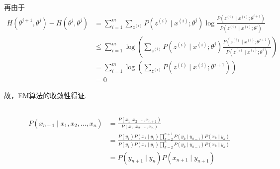 \documentclass[UTF8,a4paper,AutoFakeBold,AutoFakeSlant]{article}
\begin{document}
再由于
\begin{equation*}
  \begin{aligned}
    H\left(\theta^{j+1}, \theta^{j}\right)-H\left(\theta^{j}, \theta^{j}\right) & =\sum_{i=1}^{m} \sum_{z^{(i)}} P\left(z^{(i)} \mid x^{(i)} ; \theta^{j}\right) \log \frac{P\left(z^{(i)} \mid x^{(i)} ; \theta^{j+1}\right)}{P\left(z^{(i)} \mid x^{(i)} ; \theta^{j}\right)}                  \\
                                                                                & \leq \sum_{i=1}^{m} \log \left(\sum_{z^{(i)}} P\left(z^{(i)} \mid x^{(i)} ; \theta^{j}\right) \frac{P\left(z^{(i)} \mid x^{(i)} ; \theta^{j+1}\right)}{P\left(z^{(i)} \mid x^{(i)} ; \theta^{j}\right)}\right) \\
                                                                                & =\sum_{i=1}^{m} \log \left(\sum_{z^{(i)}} P\left(z^{(i)} \mid x^{(i)} ; \theta^{j+1}\right)\right)                                                                                                             \\
                                                                                & =0
  \end{aligned}
\end{equation*}

故，EM算法的收敛性得证.



\subsection{}

\begin{equation*}
  \begin{aligned}
    P\left(x_{n+1} \mid x_{1}, x_{2}, \ldots, x_{n}\right) & =\frac{P\left(x_{1}, x_{2}, \ldots, x_{n+1}\right)}{P\left(x_{1}, x_{2}, \ldots, x_{n}\right)}                                                                                                                                                                                   \\
                                                           & =\frac{P\left(y_{1}\right) P\left(x_{1} \mid y_{1}\right) \prod_{k=2}^{n+1} P\left(y_{k} \mid y_{k-1}\right) P\left(x_{k} \mid y_{k}\right)}{P\left(y_{1}\right) P\left(x_{1} \mid y_{1}\right) \prod_{k=2}^{n} P\left(y_{k} \mid y_{k-1}\right) P\left(x_{k} \mid y_{k}\right)} \\
                                                           & =P\left(y_{n+1} \mid y_{n}\right) P\left(x_{n+1} \mid y_{n+1}\right)
  \end{aligned}
\end{equation*}
\end{document}
